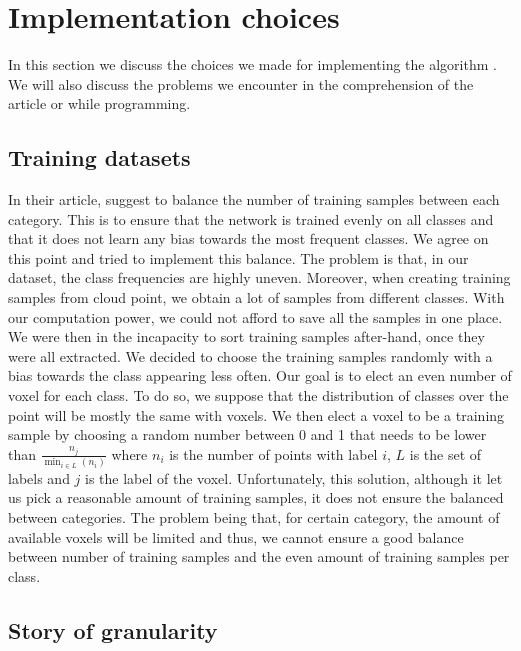 \section{Implementation choices}
\label{sec:implementation}

In this section we discuss the choices we made for implementing the algorithm \cite{7900038}.
We will also discuss the problems we encounter in the comprehension of the article or while programming.

\subsection{Training datasets}

In their article, \citeauthor*{7900038} suggest to balance the number of training samples between each category. This is to ensure that the network is trained evenly on all classes and that it does not learn any bias towards the most frequent classes. We agree on this point and tried to implement this balance. The problem is that, in our dataset, the class frequencies are highly uneven.
Moreover, when creating training samples from cloud point, we obtain a lot of samples from different classes. With our computation power, we could not afford to save all the samples in one place. We were then in the incapacity to sort training samples after-hand, once they were all extracted. We decided to choose the training samples randomly with a bias towards the class appearing less often. Our goal is to elect an even number of voxel for each class. To do so, we suppose that the distribution of classes over the point will be mostly the same with voxels. We then elect a voxel to be a training sample by choosing a random number between 0 and 1 that needs to be lower than \(\frac{n_{j}}{\min_{i \in L}(n_{i})}\) where \(n_{i}\) is the number of points with label \(i\), \(L\) is the set of labels and \(j\) is the label of the voxel. Unfortunately, this solution, although it let us pick a reasonable amount of training samples, it does not ensure the balanced between categories. The problem being that, for certain category, the amount of available voxels will be limited and thus, we cannot ensure a good balance between number of training samples and the even amount of training samples per class.

\subsection{Story of granularity}

